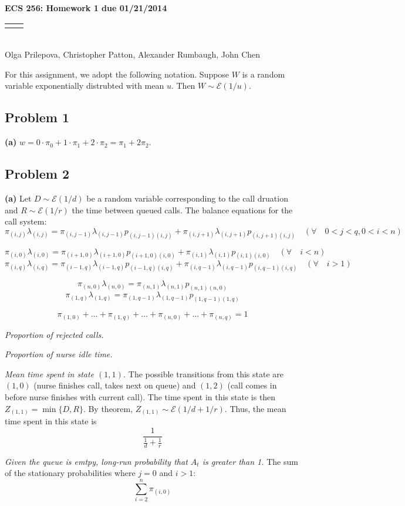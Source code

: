\documentclass[12pt]{article}
\renewcommand{\title}[1]{\textbf{#1}\\}
\renewcommand{\line}{\begin{tabularx}{\textwidth}{X>{\raggedleft}X}\hline\\\end{tabularx}\\[-0.5cm]}
\begin{document}
\title{ECS 256: Homework 1 due 01/21/2014}
\line
Olga Prilepova, Christopher Patton, Alexander Rumbaugh, John Chen %


For this assignment, we adopt the following notation. Suppose $W$ is a random
variable exponentially distrubted with mean $u$. Then $W \sim \mathcal{E}(1/u)$.

\subsection*{Problem 1}

\textbf{(a)} $w = 0 \cdot \pi_0 + 1 \cdot \pi_1 + 2 \cdot \pi_2 = \pi_1 + 2 \pi_2$. 

\subsection*{Problem 2}

\textbf{(a)} Let $D \sim \mathcal{E}(1/d)$ be a random variable corresponding 
to the call druation and $R \sim \mathcal{E}(1/r)$ the time between queued calls. 
The balance equations for the call system: 
$$ \pi_{(i,j)}\lambda_{(i,j)} = \pi_{(i,j-1)}\lambda_{(i,j-1)}p_{(i,j-1)(i,j)} + 
                                \pi_{(i,j+1)}\lambda_{(i,j+1)}p_{(i,j+1)(i,j)} 
  \quad (\forall \quad 0 < j < q, 0 < i < n)$$

$$ \pi_{(i,0)}\lambda_{(i,0)} = \pi_{(i+1,0)}\lambda_{(i+1,0)}p_{(i+1,0)(i,0)} + 
                                \pi_{(i,1)}\lambda_{(i,1)}p_{(i,1)(i,0)}
  \quad (\forall \quad i < n)$$
$$ \pi_{(i,q)}\lambda_{(i,q)} = \pi_{(i-1,q)}\lambda_{(i-1,q)}p_{(i-1,q)(i,q)} + 
                                \pi_{(i,q-1)}\lambda_{(i,q-1)}p_{(i,q-1)(i,q)}
  \quad (\forall \quad i > 1)$$

$$ \pi_{(n,0)}\lambda_{(n,0)} = \pi_{(n,1)}\lambda_{(n,1)}p_{(n,1)(n,0)} $$ 
$$ \pi_{(1,q)}\lambda_{(1,q)} = \pi_{(1,q-1)}\lambda_{(1,q-1)}p_{(1,q-1)(1,q)} $$

$$ \pi_{(1,0)} + \dots + \pi_{(1,q)} + \dots + \pi_{(n,0)} + ... + \pi_{(n,q)} = 1 $$

\textit{Proportion of rejected calls.}

\textit{Proportion of nurse idle time.}

\textit{Mean time spent in state $(1,1)$.} The possible transitions from this state are 
$(1,0)$ (nurse finishes call, takes next on queue) and $(1,2)$ (call comes in 
before nurse finishes with current call). The time spent in this state is then 
$Z_{(1,1)} = \min \{ D, R \}$. By theorem, $Z_{(1,1)} \sim \mathcal{E}(1/d + 1/r)$. Thus,
the mean time spent in this state is $$ \frac{1}{\frac{1}{d} + \frac{1}{r}} $$ 

\textit{Given the queue is emtpy, long-run probability that $A_t$ is greater than 1.} 
The sum of the stationary probabilities where $j=0$ and $i>1$: 
$$ \sum_{i=2}^n{\pi_{(i,0)}} $$
\end{document}
